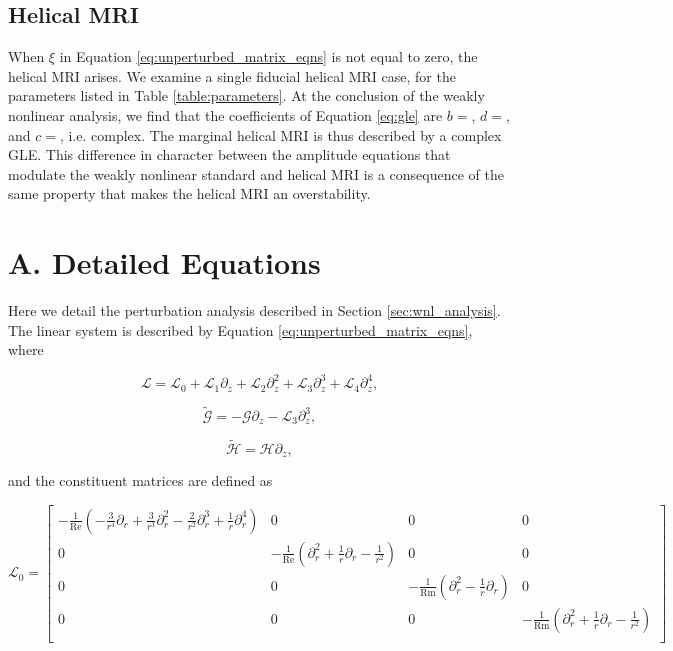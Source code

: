 \documentclass{emulateapj}
\newcommand{\beq}{\begin{equation}}
\newcommand{\eeq}{\end{equation}}
\newcommand\reye{\mathrm{Re}}
\newcommand\reym{\mathrm{Rm}}
\begin{document}

\subsection{Helical MRI}

When $\xi$ in Equation \ref{eq:unperturbed_matrix_eqns} is not equal to zero, the helical MRI arises. We examine a single fiducial helical MRI case, for the parameters listed in Table \ref{table:parameters}. At the conclusion of the weakly nonlinear analysis, we find that the coefficients of Equation \ref{eq:gle} are $b = $, $d = $, and $c = $, i.e. complex. The marginal helical MRI is thus described by a complex GLE. This difference in character between the amplitude equations that modulate the weakly nonlinear standard and helical MRI is a consequence of the same property that makes the helical MRI an overstability. 


\clearpage
\appendix

\section{A. Detailed Equations}\label{app:basic_equations}

Here we detail the perturbation analysis described in Section \ref{sec:wnl_analysis}. The linear system is described by Equation \ref{eq:unperturbed_matrix_eqns}, where 

\beq
\mathcal{L} = \mathcal{L}_0 + \mathcal{L}_1 \partial_z + \mathcal{L}_2 \partial_z^2 + \mathcal{L}_3 \partial_z^3 + \mathcal{L}_4 \partial_z^4,
\eeq

\beq
\widetilde{\mathcal{G}} = - \mathcal{G} \partial_z - \mathcal{L}_3 \partial_z^3,
\eeq

\beq
\widetilde{\mathcal{H}} = \mathcal{H} \partial_z,
\eeq

and the constituent matrices are defined as 

\beq
\mathcal{L}_0 = \left[\begin{matrix}
-\frac{1}{\reye} (-\frac{3}{r^4} \partial_r + \frac{3}{r^3}\partial_r^2 - \frac{2}{r^2}\partial_r^3 + \frac{1}{r}\partial_r^4) & 0 & 0 & 0 \\
0 & -\frac{1}{\reye} (\partial_r^2 + \frac{1}{r}\partial_r - \frac{1}{r^2}) & 0 & 0 \\
0 & 0 & -\frac{1}{\reym} (\partial_r^2 - \frac{1}{r} \partial_r) & 0 \\
0 & 0 & 0 & -\frac{1}{\reym} (\partial_r^2 + \frac{1}{r}\partial_r - \frac{1}{r^2}) \\
\end{matrix}\right]
\eeq
\end{document}
